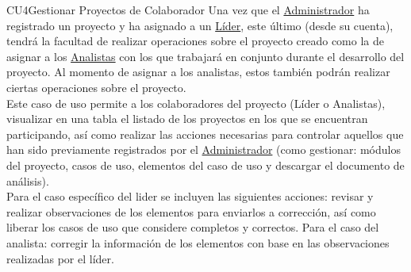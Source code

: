 	\begin{UseCase}{CU4}{Gestionar Proyectos de Colaborador}{
		Una vez que el \hyperlink{admin}{Administrador} ha registrado un proyecto y ha asignado a un \hyperlink{jefe}{Líder}, este último (desde su cuenta), tendrá la facultad de realizar operaciones sobre el proyecto creado como la de asignar a los \hyperlink{analista}{Analistas} con los que trabajará en conjunto durante el desarrollo del proyecto. Al momento de asignar a los analistas, estos también podrán realizar ciertas operaciones sobre el proyecto.\\
		
		Este caso de uso permite a los colaboradores del proyecto (Líder o Analistas), visualizar en una tabla el listado de los proyectos en los que se encuentran participando, así como realizar las acciones necesarias para controlar aquellos que han sido previamente registrados por el \hyperlink{admin}{Administrador} (como gestionar: módulos del proyecto, casos de uso, elementos del caso de uso y descargar el documento de análisis).\\
		
		Para el caso específico del lider se incluyen las siguientes acciones: revisar y realizar observaciones de los elementos para enviarlos a corrección, así como liberar los casos de uso que considere completos y correctos. Para el caso del analista: corregir la información de los elementos con base en las observaciones realizadas por el líder. \\
	}
\end{UseCase}

